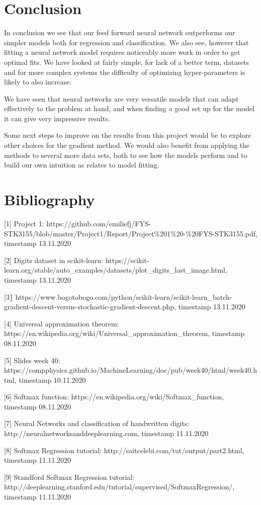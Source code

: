 \documentclass[11pt]{article}
\begin{document}
    \hypertarget{conclusion}{%
\section{Conclusion}\label{conclusion}}
In conclusion we see that our  feed forward neural network outperforms our simpler models both for regression and classification. We also see, however that fitting a neural network model requires noticeably more work in order to get optimal fits. We have looked at fairly simple, for lack of a better term, datasets and for more complex systems the difficulty of optimizing hyper-parameters is likely to also increase. 

We have seen that neural networks are very versatile models that can adapt effectively to the problem at hand, and when finding a good set up for the model it can give very impressive results.

Some next steps to improve on the results from this project would be to explore other choices for the gradient method. We would also benefit from applying the methods to several more data sets, both to see how the models perform and to build our own intuition as relates to model fitting.

    \hypertarget{bibliography}{%
\section{Bibliography}\label{bibliography}}

{[}1{]} Project 1:
https://github.com/emiliefj/FYS-STK3155/blob/master/Project1/Report/Project\%201\%20-\%20FYS-STK3155.pdf, timestamp 13.11.2020

{[}2{]} Digits dataset in scikit-learn:
https://scikit-learn.org/stable/auto\_examples/datasets/plot\_digits\_last\_image.html, timestamp 13.11.2020

{[}3\}
https://www.bogotobogo.com/python/scikit-learn/scikit-learn\_batch-gradient-descent-versus-stochastic-gradient-descent.php, timestamp 13.11.2020

{[}4{]} Universal approximation theorem:
https://en.wikipedia.org/wiki/Universal\_approximation\_theorem, timestamp 08.11.2020

{[}5{]} Slides week 40:
https://compphysics.github.io/MachineLearning/doc/pub/week40/html/week40.html, timestamp 10.11.2020

{[}6{]} Softmax function:
https://en.wikipedia.org/wiki/Softmax\_function, timestamp 08.11.2020

{[}7{]} Neural Networks and classification of handwritten digits:
http://neuralnetworksanddeeplearning.com, timestamp 11.11.2020

{[}8{]} Softmax Regression tutorial:
http://saitcelebi.com/tut/output/part2.html, timestamp 11.11.2020

{[}9{]} Standford Softmax Regression tutorial:
http://deeplearning.stanford.edu/tutorial/supervised/SoftmaxRegression/, timestamp 11.11.2020
    
    
    
\end{document}
